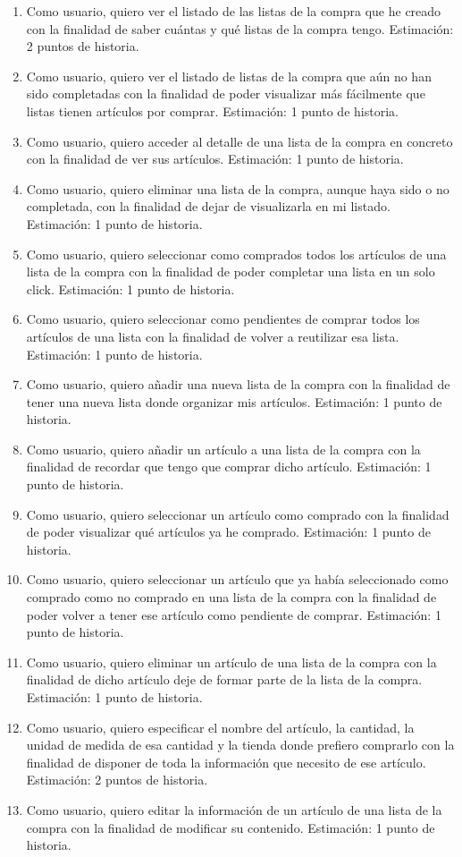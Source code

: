 \begin{enumerate}
  \item Como usuario, quiero ver el listado de las listas de la compra que he creado con la finalidad de saber cuántas y qué listas de la compra tengo. Estimación: 2 puntos de historia.
  \item Como usuario, quiero ver el listado de listas de la compra que aún no han sido completadas con la finalidad de poder visualizar más fácilmente que listas tienen artículos por comprar. Estimación: 1 punto de historia.
  \item Como usuario, quiero acceder al detalle de una lista de la compra en concreto con la finalidad de ver sus artículos. Estimación: 1 punto de historia.
  \item Como usuario, quiero eliminar una lista de la compra, aunque haya sido o no completada, con la finalidad de dejar de visualizarla en mi listado. Estimación: 1 punto de historia.
  \item Como usuario, quiero seleccionar como comprados todos los artículos de una lista de la compra con la finalidad de poder completar una lista en un solo click. Estimación: 1 punto de historia.
  \item Como usuario, quiero seleccionar como pendientes de comprar todos los artículos de una lista con la finalidad de volver a reutilizar esa lista. Estimación: 1 punto de historia.
  \item Como usuario, quiero añadir una nueva lista de la compra con la finalidad de tener una nueva lista donde organizar mis artículos. Estimación: 1 punto de historia.
  \item Como usuario, quiero añadir un artículo a una lista de la compra con la finalidad de recordar que tengo que comprar dicho artículo. Estimación: 1 punto de historia.
  \item Como usuario, quiero seleccionar un artículo como comprado con la finalidad de poder visualizar qué artículos ya he comprado. Estimación: 1 punto de historia.
  \item 	Como usuario, quiero seleccionar un artículo que ya había seleccionado como comprado como no comprado en una lista de la compra con la finalidad de poder volver a tener ese artículo como pendiente de comprar. Estimación: 1 punto de historia.
  \item Como usuario, quiero eliminar un artículo de una lista de la compra con la finalidad de dicho artículo deje de formar parte de la lista de la compra. Estimación: 1 punto de historia.
  \item Como usuario, quiero especificar el nombre del artículo, la cantidad, la unidad de medida de esa cantidad y la tienda donde prefiero comprarlo con la finalidad de disponer de toda la información que necesito de ese artículo. Estimación: 2 puntos de historia.
  \item Como usuario, quiero editar la información de un artículo de una lista de la compra con la finalidad de modificar su contenido. Estimación: 1 punto de historia.
\end{enumerate}

